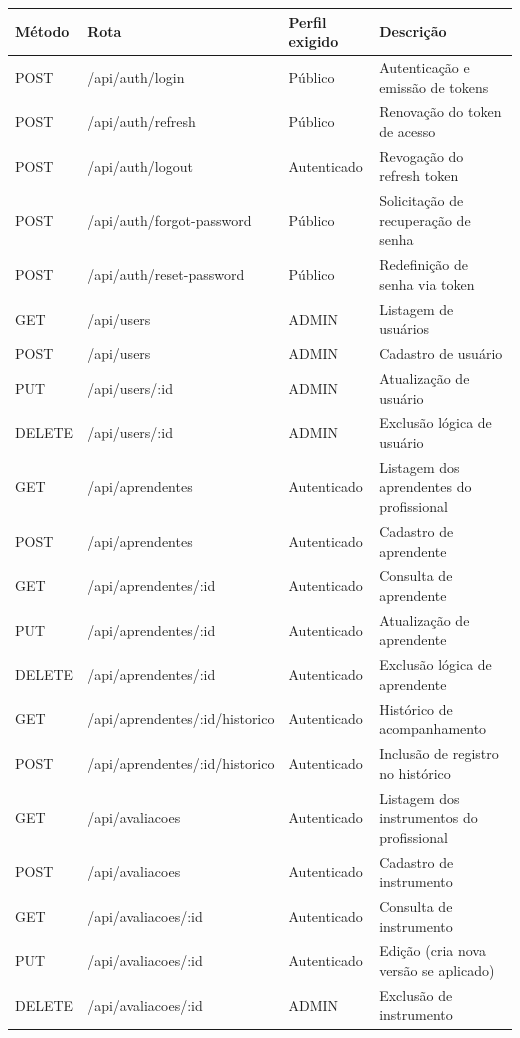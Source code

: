 \begin{table}[H]
\centering
\small
\begin{tabular}{p{1.5cm} p{6cm} p{2.5cm} p{4.5cm}}
\hline
\textbf{Método} & \textbf{Rota} & \textbf{Perfil exigido} & \textbf{Descrição} \\
\hline
POST & /api/auth/login & Público & Autenticação e emissão de tokens \\
POST & /api/auth/refresh & Público & Renovação do token de acesso \\
POST & /api/auth/logout & Autenticado & Revogação do refresh token \\
POST & /api/auth/forgot-password & Público & Solicitação de recuperação de senha \\
POST & /api/auth/reset-password & Público & Redefinição de senha via token \\
\hline
GET  & /api/users & ADMIN & Listagem de usuários \\
POST & /api/users & ADMIN & Cadastro de usuário \\
PUT  & /api/users/:id & ADMIN & Atualização de usuário \\
DELETE & /api/users/:id & ADMIN & Exclusão lógica de usuário \\
\hline
GET  & /api/aprendentes & Autenticado & Listagem dos aprendentes do profissional \\
POST & /api/aprendentes & Autenticado & Cadastro de aprendente \\
GET  & /api/aprendentes/:id & Autenticado & Consulta de aprendente \\
PUT  & /api/aprendentes/:id & Autenticado & Atualização de aprendente \\
DELETE & /api/aprendentes/:id & Autenticado & Exclusão lógica de aprendente \\
GET  & /api/aprendentes/:id/historico & Autenticado & Histórico de acompanhamento \\
POST & /api/aprendentes/:id/historico & Autenticado & Inclusão de registro no histórico \\
\hline
GET  & /api/avaliacoes & Autenticado & Listagem dos instrumentos do profissional \\
POST & /api/avaliacoes & Autenticado & Cadastro de instrumento \\
GET  & /api/avaliacoes/:id & Autenticado & Consulta de instrumento \\
PUT  & /api/avaliacoes/:id & Autenticado & Edição (cria nova versão se aplicado) \\
DELETE & /api/avaliacoes/:id & ADMIN & Exclusão de instrumento \\

\end{tabular}
\end{table}
